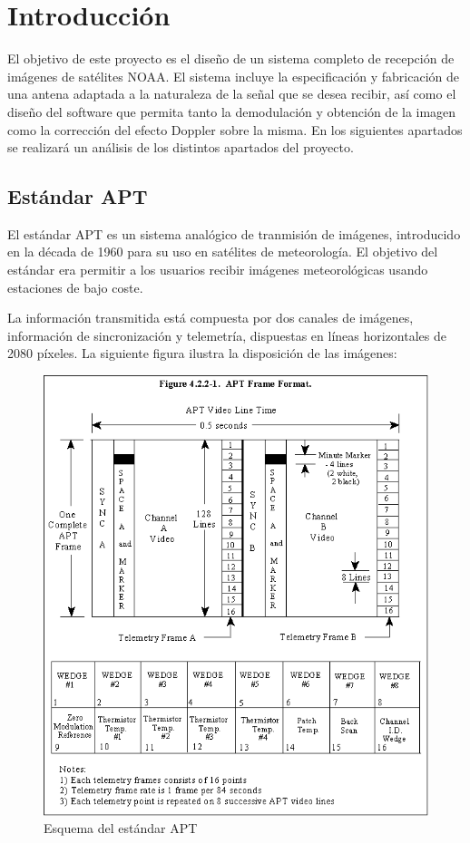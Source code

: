 \documentclass[a4paper,openright,12pt]{article}
\begin{document}


\tableofcontents
\newpage

\section{Introducción}

	El objetivo 	de este proyecto es el diseño de un sistema completo de recepción de imágenes de satélites NOAA. El sistema incluye la especificación y fabricación de una antena adaptada a la naturaleza de la señal que se desea recibir, así como el diseño del software que permita tanto la demodulación y obtención de la imagen como la corrección del efecto Doppler sobre la misma. En los siguientes apartados se realizará un análisis de los distintos apartados del proyecto.
	
	\subsection{Estándar APT}
	
	El estándar APT es un sistema analógico de tranmisión de imágenes, introducido en la década de 1960 para su uso en satélites de meteorología. El objetivo del estándar era permitir a los usuarios recibir imágenes meteorológicas usando estaciones de bajo coste. 
	
	La información transmitida está compuesta por dos canales de imágenes, información de sincronización y telemetría, dispuestas en líneas horizontales de 2080 píxeles. La siguiente figura ilustra la disposición de las imágenes:
	
	\begin{figure}[hbtp]
 \centering
 \includegraphics[width = 16cm]{imagenes/APT_frame.gif}
 \caption{Esquema del estándar APT}
 \label{APT}
 \end{figure}
\end{document}
